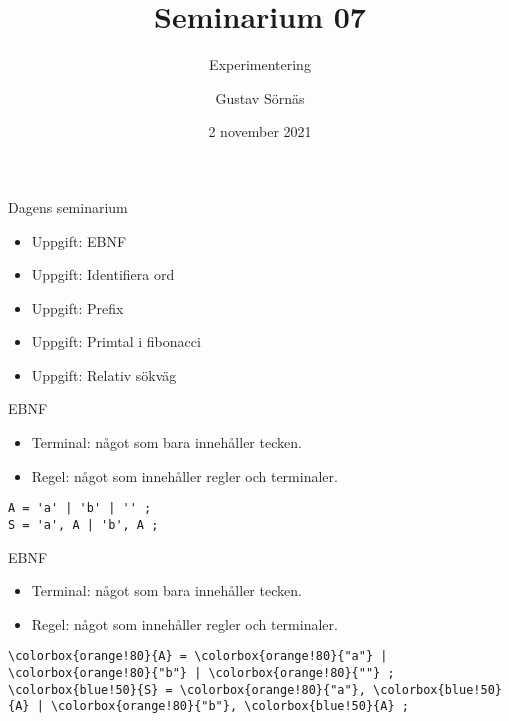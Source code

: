 \documentclass{beamer}
\title{Seminarium 07}
\subtitle{Experimentering}
\date{2 november 2021}
\author{Gustav Sörnäs}
\begin{document}
  \frame{\titlepage}

  \begin{frame}{Dagens seminarium}

    \begin{itemize}
      \item Uppgift: EBNF
      \item Uppgift: Identifiera ord
      \item Uppgift: Prefix
      \item Uppgift: Primtal i fibonacci
      \item Uppgift: Relativ sökväg
    \end{itemize}

  \end{frame}

  \begin{frame}[fragile]{EBNF}
    \begin{itemize}
      \item Terminal: något som bara innehåller tecken.
      \item Regel: något som innehåller regler och terminaler.
    \end{itemize}

    \begin{Verbatim}[commandchars=\\\{\}]
A = 'a' | 'b' | '' ;
S = 'a', A | 'b', A ;
    \end{Verbatim}
  \end{frame}

  \begin{frame}[fragile]{EBNF}
    \begin{itemize}
      \item \colorbox{orange!80}{Terminal}: något som bara innehåller tecken.
      \item \colorbox{blue!50}{Regel}: något som innehåller regler och terminaler.
    \end{itemize}

    \begin{Verbatim}[commandchars=\\\{\}]
\colorbox{orange!80}{A} = \colorbox{orange!80}{"a"} | \colorbox{orange!80}{"b"} | \colorbox{orange!80}{""} ;
\colorbox{blue!50}{S} = \colorbox{orange!80}{"a"}, \colorbox{blue!50}{A} | \colorbox{orange!80}{"b"}, \colorbox{blue!50}{A} ;
    \end{Verbatim}
  \end{frame}
\end{document}
